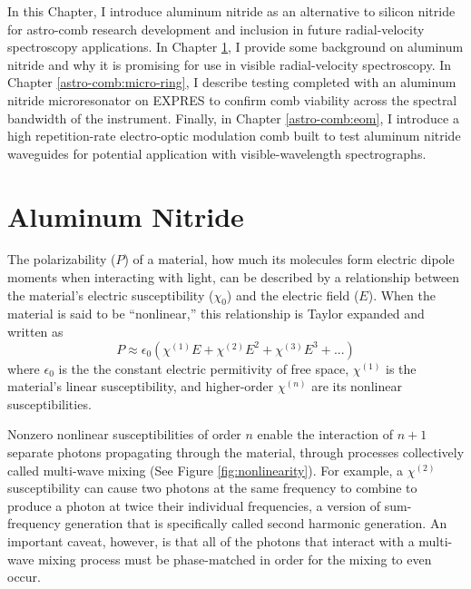 In this Chapter, I introduce aluminum nitride as an alternative to silicon nitride for astro-comb research development and inclusion in future radial-velocity spectroscopy applications. In Chapter \ref{astro-comb:aln}, I provide some background on aluminum nitride and why it is promising for use in visible radial-velocity spectroscopy. In Chapter \ref{astro-comb:micro-ring}, I describe testing completed with an aluminum nitride microresonator on EXPRES to confirm comb viability across the spectral bandwidth of the instrument. Finally, in Chapter \ref{astro-comb:eom}, I introduce a high repetition-rate electro-optic modulation comb built to test aluminum nitride waveguides for potential application with visible-wavelength spectrographs.

\section{Aluminum Nitride} \label{astro-comb:aln}

The polarizability ($P$) of a material, how much its molecules form electric dipole moments when interacting with light, can be described by a relationship between the material's electric susceptibility ($\chi_0$) and the electric field ($E$). When the material is said to be ``nonlinear,'' this relationship is Taylor expanded and written as
\begin{equation}
    P \approx \epsilon_0 \left( \chi^{(1)} E + \chi^{(2)} E^2 + \chi^{(3)} E^3 + ... \right)
    \label{eq:polarizability}
\end{equation}
where $\epsilon_0$ is the the constant electric permitivity of free space, $\chi^{(1)}$ is the material's linear susceptibility, and higher-order $\chi^{(n)}$ are its nonlinear susceptibilities. 

Nonzero nonlinear susceptibilities of order $n$ enable the interaction of $n+1$ separate photons propagating through the material, through processes collectively called multi-wave mixing (See Figure \ref{fig:nonlinearity}). For example, a $\chi^{(2)}$ susceptibility can cause two photons at the same frequency to combine to produce a photon at twice their individual frequencies, a version of sum-frequency generation that is specifically called second harmonic generation. An important caveat, however, is that all of the photons that interact with a multi-wave mixing process must be phase-matched in order for the mixing to even occur.

